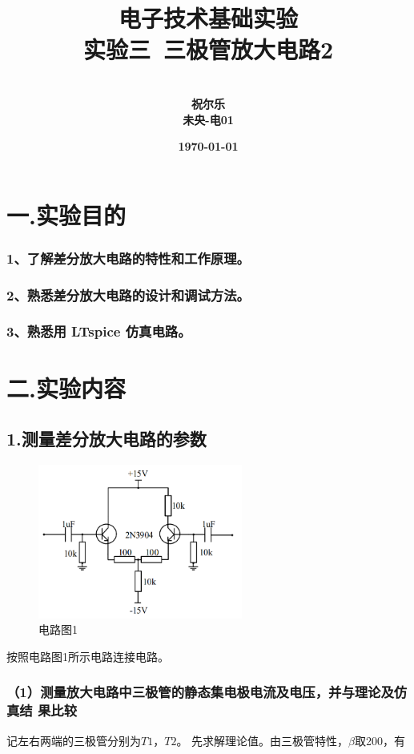 \documentclass[UTF8]{ctexart}
\title{{电子技术基础实验} \\ \textbf{实验三\ 三极管放大电路2}}
\author{\\\textbf{祝尔乐}
        \\\textbf{未央-电01}
        }
\date{\textbf{\today}}
\begin{document}
\maketitle

\section*{一.实验目的}
\subsubsection*{1、了解差分放大电路的特性和工作原理。}

\subsubsection*{2、熟悉差分放大电路的设计和调试方法。}

\subsubsection*{3、熟悉用 LTspice 仿真电路。}


\section*{二.实验内容}

\subsection*{1.测量差分放大电路的参数}
\begin{figure}[htbp]
    \centering
    \includegraphics[width=0.60\textwidth]{电路图1.png}
    \caption{电路图1}
\end{figure}

按照电路图1所示电路连接电路。

\subsubsection*{（1）测量放大电路中三极管的静态集电极电流及电压，并与理论及仿真结
果比较}
记左右两端的三极管分别为$T1$，$T2$。
先求解理论值。由三极管特性，$\beta$取200，有
\end{document}
